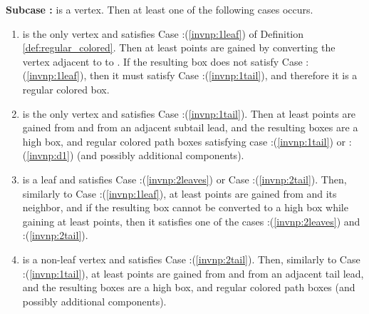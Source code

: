 \documentclass[11pt]{article}
\def\dnsitem{\vspace{-7pt}\item}
\theoremstyle{definition}
\begin{document}
\smallskip
\par\noindent
{\bf Subcase :}
 is a  vertex. Then at least one of the following cases occurs.
	\begin{enumerate}
		\dnsitem  is the only  vertex and  satisfies Case :(\ref{invnp:1leaf}) of Definition \ref{def:regular_colored}. 
		Then at least  points are gained by converting the vertex  adjacent to  to . 
		If the resulting box does not satisfy Case :(\ref{invnp:1leaf}), then it must satisfy Case :(\ref{invnp:1tail}), and therefore it is a regular colored box.
		
		\dnsitem  is the only  vertex and  satisfies Case :(\ref{invnp:1tail}).
		Then at least  points are gained from  and from an adjacent subtail lead, and the resulting boxes are a high box, 
		and regular colored path boxes satisfying case :(\ref{invnp:1tail}) or :(\ref{invnp:d1}) 
		(and possibly additional  components). 
		
		\dnsitem  is a  leaf and  satisfies Case :(\ref{invnp:2leaves}) or Case :(\ref{invnp:2tail}). 
		Then, similarly to Case :(\ref{invnp:1leaf}), at least  points are gained from  and its neighbor, and if the resulting box cannot be converted to a high box while gaining at least  points, 
		then it satisfies one of the cases :(\ref{invnp:2leaves}) and :(\ref{invnp:2tail}).
		
		\dnsitem  is a non-leaf vertex and  satisfies Case :(\ref{invnp:2tail}).
		Then, similarly to Case :(\ref{invnp:1tail}), at least  points are gained from  and from an adjacent tail lead, and the resulting boxes are a high box, and regular colored path boxes 
		(and possibly additional  components). 
	\end{enumerate}
\end{document}
